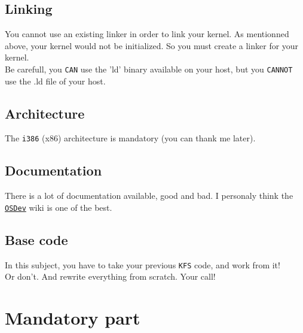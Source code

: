 \documentclass{42-en}
\begin{document}
    \section{Linking}
        You cannot use an existing linker in order to link your kernel.
        As mentionned above, your kernel would not be initialized. So you must
        create a linker for your kernel.\\
        Be carefull, you \texttt{CAN} use the 'ld' binary available on your
        host, but you \texttt{CANNOT} use the .ld file of your host.
    \section{Architecture}
        The \texttt{i386} (x86) architecture is mandatory (you can thank
        me later).
    \section{Documentation}
        There is a lot of documentation available, good and bad.
        I personaly think the \texttt{\href{http://wiki.osdev.org/Main_Page}
        {OSDev}} wiki is one of the best.
    \section{Base code}
        In this subject, you have to take your previous \texttt{KFS} code,
        and work from it!\\
        Or don't. And rewrite everything from scratch. Your call!
\newpage

\chapter{Mandatory part}
\end{document}
